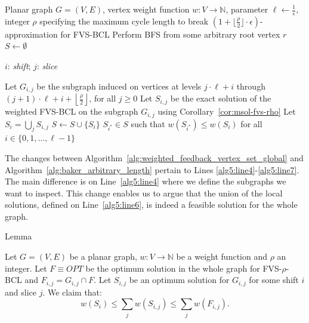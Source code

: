 \begin{algorithm}[H]
    \caption{Baker's technique for the weighted \textsc{FVS-BCL}}
    \label{alg:baker_arbitrary_length}
    \begin{algorithmic}[1]
    \REQUIRE Planar graph $G = (V, E)$, vertex weight function $w : V \rightarrow \mathbb{N}$, parameter $\ell \leftarrow \frac{1}{\epsilon}$, integer $\rho$ specifying the maximum cycle length to break
    \ENSURE $(1 + \lfloor \frac{\rho}{2} \rfloor \cdot \epsilon)$-approximation for \textsc{FVS-BCL}
    \STATE Perform \textsc{BFS} from some arbitrary root vertex $r$ \label{alg5:line1}
    \STATE $S \leftarrow \emptyset$
    
    $i$: \textit{shift}; $j$: \textit{slice}
    
        \STATE Let $G_{i,j}$ be the subgraph induced on vertices at levels $j \cdot \ell + i$ through $(j+1) \cdot \ell + i + \left\lfloor \frac{\rho}{2} \right\rfloor$, for all $j \geq 0$ \label{alg5:line4}
        \STATE Let $S_{i, j}$ be the exact solution of the weighted FVS-BCL on the subgraph $G_{i, j}$ using Corollary~\ref{cor:msol-fvs-rho} \label{alg5:line5}
        \STATE Let $S_i = \bigcup_{j} S_{i,j}$ \label{alg5:line6}
        \STATE $S \leftarrow S \cup \{S_i\}$ \label{alg5:line7}
    \ENDFOR
    \RETURN $S_{i^*} \in S$ such that $w(S_{i^*}) \leq w(S_i)$ for all $i \in \{0, 1, \dots, \ell - 1\}$ \label{alg5:line9}
    \end{algorithmic}
\end{algorithm}


 The changes between Algorithm~\ref{alg:weighted_feedback_vertex_set_global} and 
Algorithm~\ref{alg:baker_arbitrary_length} pertain to Lines \ref{alg5:line4}-\ref{alg5:line7}.
The main difference is on Line~\ref{alg5:line4} where 
we define the subgraphs we want to inspect. This change enables us to argue that the union 
of the local solutions, defined on Line~\ref{alg5:line6}, is indeed a feasible solution for the
whole graph. 

\begin{mydefinition}{Lemma}
    \label{lemma:optimum_solution_bound_rho_cycle_length}

    Let $G = (V, E)$ be a planar graph, $w : V \rightarrow \mathbb{N}$ be a weight function and 
    $\rho$ an integer. Let $F \equiv OPT$ be the optimum solution in the whole graph for 
    FVS-$\rho$-BCL and $F_{i, j} = G_{i, j} \cap F$.
    Let $S_{i, j}$ be an optimum solution for $G_{i, j}$ for some shift $i$ and slice $j$.
    We claim that: \[w(S_i) \leq \sum\limits_{j} w(S_{i, j}) \leq \sum\limits_{j} w(F_{i, j})\text{.}\]

\end{mydefinition}


